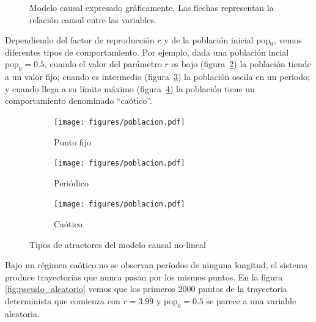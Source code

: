 \documentclass[a4paper,10pt]{book}
\theoremstyle{definition}
\begin{document}

\begin{figure}[ht!]
\centering
{}
\caption{Modelo causal expresado gr\'aficamente. Las flechas representan la relaci\'on causal entre las variables. }
\label{fig:modelo_poblacional}
\end{figure}


Dependiendo del factor de reproducci\'on $r$ y de la poblaci\'on inicial pop$_0$, vemos diferentes tipos de comportamiento.
%
Por ejemplo, dada una poblaci\'on incial $\text{pop}_0 = 0.5$, cuando el valor del par\'ametro $r$ es bajo (figura~\ref{fig:poblacion_punto_fijo}) la poblaci\'on tiende a un valor fijo;
cuando es intermedio (figura~\ref{fig:poblacion_periodico}) la poblaci\'on oscila en un per\'iodo;
y cuando llega a su l\'imite m\'aximo (figura~\ref{fig:poblacion_caotico}) la poblaci\'on tiene un comportamiento denominado ``ca\'otico''.
%
\begin{figure}[ht!]
    \centering
    \begin{subfigure}[b]{0.32\textwidth}
    \texttt{[image: figures/poblacion.pdf]}
    \caption{Punto fijo}
    \label{fig:poblacion_punto_fijo}
    \end{subfigure}
    \begin{subfigure}[b]{0.32\textwidth}
    \texttt{[image: figures/poblacion.pdf]}
    \caption{Peri\'odico}
    \label{fig:poblacion_periodico}
    \end{subfigure}
    \begin{subfigure}[b]{0.32\textwidth}
    \texttt{[image: figures/poblacion.pdf]}
    \caption{Ca\'otico}
    \label{fig:poblacion_caotico}
    \end{subfigure}
    \caption{
    Tipos de atractores del modelo causal no-lineal
    }
    \label{fig:poblacion}
\end{figure}
%
Bajo un r\'egimen ca\'otico no se observan per\'iodos de ninguna longitud, el sistema produce trayectorias que nunca pasan por los mismos puntos.
%
En la figura \ref{fig:pseudo_aleatorio} vemos que los primeros 2000 puntos de la trayectoria determinista que comienza con $r=3.99$ y $\text{pop}_0 = 0.5$ se parece a una variable aleatoria.
\end{document}
